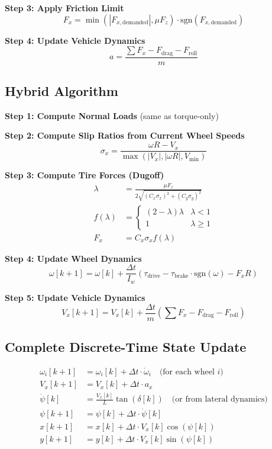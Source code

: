 \documentclass[11pt,a4paper]{article}
\begin{document}
\textbf{Step 3: Apply Friction Limit}
\begin{equation}
F_x = \min(|F_{x,\text{demanded}}|, \mu F_z) \cdot \text{sgn}(F_{x,\text{demanded}})
\end{equation}

\textbf{Step 4: Update Vehicle Dynamics}
\begin{equation}
a = \frac{\sum F_x - F_{\text{drag}} - F_{\text{roll}}}{m}
\end{equation}

\subsection{Hybrid Algorithm}

\textbf{Step 1: Compute Normal Loads} (same as torque-only)

\textbf{Step 2: Compute Slip Ratios from Current Wheel Speeds}
\begin{equation}
\sigma_x = \frac{\omega R - V_x}{\max(|V_x|, |\omega R|, V_{\min})}
\end{equation}

\textbf{Step 3: Compute Tire Forces (Dugoff)}
\begin{align}
\lambda &= \frac{\mu F_z}{2\sqrt{(C_x \sigma_x)^2 + (C_y \sigma_y)^2}} \\
f(\lambda) &= \begin{cases} (2-\lambda)\lambda & \lambda < 1 \\ 1 & \lambda \geq 1 \end{cases} \\
F_x &= C_x \sigma_x f(\lambda)
\end{align}

\textbf{Step 4: Update Wheel Dynamics}
\begin{equation}
\omega[k+1] = \omega[k] + \frac{\Delta t}{I_w}(\tau_{\text{drive}} - \tau_{\text{brake}} \cdot \text{sgn}(\omega) - F_x R)
\end{equation}

\textbf{Step 5: Update Vehicle Dynamics}
\begin{equation}
V_x[k+1] = V_x[k] + \frac{\Delta t}{m}(\sum F_x - F_{\text{drag}} - F_{\text{roll}})
\end{equation}

\subsection{Complete Discrete-Time State Update}

\begin{align}
\omega_i[k+1] &= \omega_i[k] + \Delta t \cdot \dot{\omega}_i \quad \text{(for each wheel $i$)} \\
V_x[k+1] &= V_x[k] + \Delta t \cdot a_x \\
\dot{\psi}[k] &= \frac{V_x[k]}{L} \tan(\delta[k]) \quad \text{(or from lateral dynamics)} \\
\psi[k+1] &= \psi[k] + \Delta t \cdot \dot{\psi}[k] \\
x[k+1] &= x[k] + \Delta t \cdot V_x[k] \cos(\psi[k]) \\
y[k+1] &= y[k] + \Delta t \cdot V_x[k] \sin(\psi[k])
\end{align}
\end{document}
